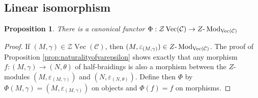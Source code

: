\documentclass[a4paper,11pt,reqno]{amsart}
\numberwithin{equation}{section}
\newtheorem{proposition}[theorem]{Proposition}
\theoremstyle{remark}
\theoremstyle{definition}
\def\-{{\hbox{-}}}
\newcommand{\cC}{\mathcal C}
\newcommand{\cZ}{\mathcal Z}
\DeclareMathOperator{\Mod}{Mod}
\DeclareMathOperator{\Vect}{Vec}
\begin{document}
\subsection{Linear isomorphism}

\begin{proposition}
	There is a canonical functor $\Phi: \cZ \Vect(\cC) \to Z \- \Mod_{\Vect(\cC)}$
	\label{prop:functorcentertomodules}
\end{proposition}
\begin{proof}
	If $(M,\gamma) \in \cZ \Vect(\cC)$, then $(M,\varepsilon_{(M,\gamma)}) \in Z \- \Mod_{\Vect(\cC)}$. The proof of Proposition \ref{prop:naturalityofvarepsilon} shows exactly that any morphism $f: (M,\gamma) \to (N,\theta)$ of half-braidings is also a morphism between the $Z$-modules $(M,\varepsilon_{(M,\gamma)})$ and $(N,\varepsilon_{(N,\theta)})$. Define then $\Phi$ by $\Phi(M,\gamma) = (M,\varepsilon_{(M,\gamma)})$ on objects and $\Phi(f) = f$ on morphisms.
\end{proof}
\end{document}

